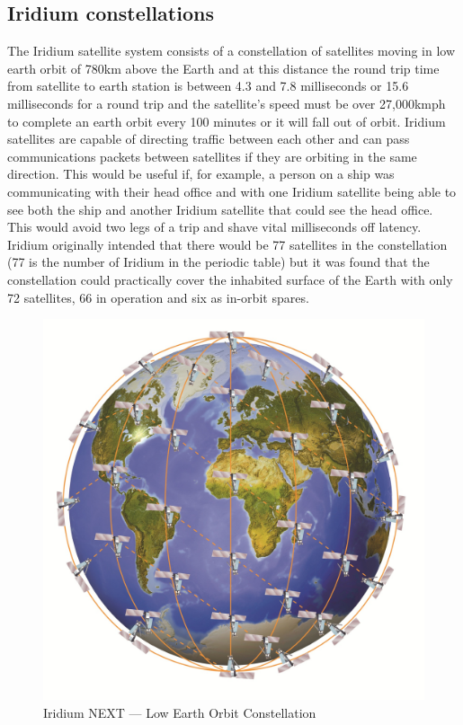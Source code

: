 \subsection{Iridium constellations}
The Iridium satellite system consists of a constellation of satellites moving in low earth orbit of 780km above the Earth and at this distance the round trip time from satellite to earth station is between 4.3 and 7.8 milliseconds or 15.6 milliseconds for a round trip and the satellite's speed must be over 27,000kmph to complete an earth orbit every 100 minutes or it will fall out of orbit. Iridium satellites are capable of directing traffic between each other and can pass communications packets between satellites if they are orbiting in the same direction. This would be useful if, for example, a person on a ship was communicating with their head office and with one Iridium satellite being able to see both the ship and another Iridium satellite that could see the head office. This would avoid two legs of a trip and shave vital milliseconds off latency. Iridium originally intended that there would be 77 satellites in the constellation (77 is the number of Iridium in the periodic table) but it was found that the constellation could practically cover the inhabited surface of the Earth with only 72 satellites, 66 in operation and six as in-orbit spares\cite{RefWorks:342}.

\begin{figure}[ht]
\centering
\includegraphics[scale=0.75]{figures/iridium_global_network.png}
\caption{Iridium NEXT --- Low Earth Orbit Constellation\cite{RefWorks:343}}
\label{fig:iridium}
\end{figure}


